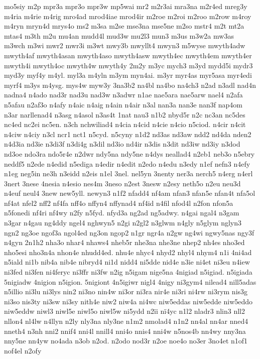 {mo5siy
m2p
mpr3a
mpr3o
mpr3w
mp5wai
mr2
m2r3ai
mra3na
m2r4ed
mreg3y
m4ria
m4rie
m4rig
mro4ad
mrod4iae
mrod4ir
m2roe
m2roi
m2roo
m2row
m4roy
m4ryn
mryn4d
mrys4o
ms2
m3sa
m2se
mse3na
mse5ne
m2so
mstr4
m2t
mt2a
mtas4
m3th
m2u
mu4an
mudd4l
mud3w
mu2l3
mun3
m3us
m3w2a
mw3as
m3wch
m3wi
mwr2
mwr3i
m3wt
mwy3b
mwyllt4
mwyn3
m5wyse
mwyth4adw
mwyth4af
mwyth4asan
mwyth4aso
mwyth4asw
mwyth4ec
mwyth4em
mwyth4er
mwyth4i
mwyth4oc
mwyth4w
mwyth4y
2m2y
m3yc
mych3
m3yd
mydd5i
mydr3
myd3y
myf4y
m4yl.
myl3a
m4yln
m3ym
myn4ai.
m3yr
myr4as
myr5asa
myr4edi
myrf4
m3ys
m4ysg.
mys4w
myw3y
3na3b2
na4bl
na4bo
na4ch3
n2ad
n3adl
nad4n
nadna4
n4ado
nad3r
nad3u
nad3w
n3adwr
n1ae
nae5ara
nae5arw
nael4
n2afa
n5afau
n2af3o
n4afy
n4aic
n4aig
n4ain
n4air
n3al
nan3a
nan3e
nan3f
nap4om
n3ar
narllenad4
n3asg
n4asol
n3as4t
1nat
nau3
n1b2
nbyd5r
n2c
nc3an
nc5des
nc4ed
nc2ei
nc5en.
n3ch
nchwiliad4
n4cia
n4cid
n4cie
n4cio
n5ciod.
n4cir
n4cit
n4ciw
n4ciy
n3cl
ncr1
nct1
n5cyd.
n5cyny
n1d2
nd3as
nd3aw
ndd2
nd4da
nden2
n4d3ia
nd3ie
n3di3f
n3di4g
n3dil
nd3io
nd4ir
n3dis
n3dit
nd3iw
nd3iy
n3dod
nd3oe
ndo3ra
ndo5r4e
n2dwr
ndy5na
ndy5ne
n4dys
neallad4
n2eb1
neb3o
n5ebry
neddf5
n2ede
n4edid
n5ediga
n4edir
n4edit
n2edo
n4edu
n3edy
n1ef
nefn3
n4efy
n1eg
neg5in
ne3h
n3eidd
n2eis
n1el
3nel.
nel5yn
3nenty
ner3a
nerch5
n4erg
n4erl
3nert
3nese
4nesia
n4esio
nes4m
3neso
n2est
3nesw
n2esy
neth5o
n2eu
neu3d
n4euf
neul4
3new
new5yll.
newyn3
n1f2
nfadd4
nf4am
nfan3
nfan5e
nfan4t
nfa5ol
nf4at
nfel2
nff2
nf4fa
nff4o
nffyn4
nffynad4
nf4id
n4fil
nfod4l
n2fon
nfon5a
n5fonedi
nf4ri
nf4wy
n2fy
n5fyd.
nfyd3a
ng2ad
ng5adwy.
n4gai
ngal4
n3gam
n3gar
n4gau
ng4ddy
ngel4
nghwyn5
n2gi
n2gl2
n3glwm
n4gly
n5glym
nglyn3
ngn2
ng3oe
ngof3a
ngol4ed
ng3on
ngop2
n1gr
ngr4a
n2gw
ng4wi
ngwy5nas
ngy3f
n4gyn
2n1h2
nha3o
nhar4
nhaws4
nheb5r
nhe3na
nhe3ne
nhep2
nh4es
nho3ed
nho5esi
nho3n4a
nhon4e
nhudd4ed.
nhu4e
nhyc4
nhyd2
nhyl4
nhym4
n1i
4ni4ad
n5iald
ni1b
nib4a
nib4e
nibryd4
ni1d
nidd4
ni5dde
nid4e
n3ie
ni4et
ni3eu
n4iew
ni3fed
ni3fen
ni4feryc
ni3ffr
ni3fw
n2ig
n5igam
nige5na
4nigiad
n5igiad.
n5igiada
5nigiadw
4nigion
n5igion.
5nigiont
4n5igiwr
nigl4
4nigy
ni3gym4
nilead4
nill5adas
n5illio
ni3lu
ni3lys
nin2
ni3no
nin4w
ni3or
ni3ra
nir4e
ni3ri
ni4rw
ni3rym
nis3g
ni3so
nis3ty
ni3sw
ni3sy
nith4e
niw2
niw4a
ni4wc
niw5eddas
niw5edde
niw5eddo
niw5eddw
niwl3
niwl5e
niwl5o
niwl5w
ni5ydd
n2ïi
nï4yc
n1l2
nladr3
nlin3
nll2
nllon4
nl4lw
n4llyn
n2ly
nly3na
nly3ne
n1m2
nmolad4
n1n2
nn4al
nn4ar
nned4
nneth4
n3nh
nni2
nnif4
nni4l
nnill4
nni4o
nnis4
nni4w
n5nos4b
nn4wy
nny3na
nny5ne
nn4yw
no4ada
n3ob
n2od.
n2odo
nod3r
n2oe
noe4o
no3er
3no4et
n1of1
nof4el
n2ofy
}
